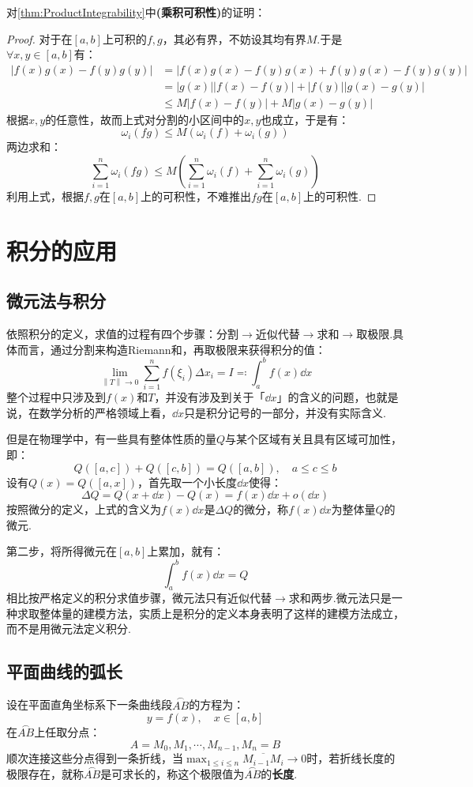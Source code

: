 对\cref{thm:ProductIntegrability}中\textbf{(乘积可积性)}的证明：
\begin{proof}
    对于在$[a,b]$上可积的$f,g$，其必有界，不妨设其均有界$M$.于是$\forall x,y\in[a,b]$有：
    \begin{align*}
        |f(x)g(x)-f(y)g(y)| &= |f(x)g(x)-f(y)g(x)+f(y)g(x)-f(y)g(y)|\\
        &= |g(x)||f(x)-f(y)| + |f(y)||g(x)-g(y)|\\
        &\leqslant M|f(x)-f(y)| + M|g(x)-g(y)|
    \end{align*}
    根据$x,y$的任意性，故而上式对分割的小区间中的$x,y$也成立，于是有：
    \[\omega_i(fg) \leqslant M(\omega_i(f)+\omega_i(g))\]
    两边求和：
    \[\sum_{i=1}^{n}\omega_i(fg) \leqslant M\left(\sum_{i=1}^{n}\omega_i(f)+\sum_{i=1}^{n}\omega_i(g)\right)\]
    利用上式，根据$f,g$在$[a,b]$上的可积性，不难推出$fg$在$[a,b]$上的可积性.
\end{proof}


\section{积分的应用}
\subsection{微元法与积分}
依照积分的定义，求值的过程有四个步骤：分割$\rightarrow$近似代替$\rightarrow$求和$\rightarrow$取极限.具体而言，通过分割来构造Riemann和，再取极限来获得积分的值：
\[\lim_{\left\|T\right\|\to 0}\sum_{i=1}^{n}f(\xi_i)\Delta x_i = I \eqcolon \int_{a}^{b}f(x)\dd{x}\]
整个过程中只涉及到$f(x)$和$T$，并没有涉及到关于「$\dd{x}$」的含义的问题，也就是说，在数学分析的严格领域上看，$\dd{x}$只是积分记号的一部分，并没有实际含义.

但是在物理学中，有一些具有整体性质的量$Q$与某个区域有关且具有区域可加性，即：
\[Q([a,c])+Q([c,b])=Q([a,b]),\quad a \leqslant c \leqslant b\]
设有$Q(x) = Q([a,x])$，首先取一个小长度$\dd{x}$使得：
\[\Delta Q = Q(x+\dd{x}) - Q(x) = f(x)\dd{x} + o(\dd{x})\]
按照微分的定义，上式的含义为$f(x)\dd{x}$是$\Delta Q$的微分，称$f(x)\dd{x}$为整体量$Q$的微元.

第二步，将所得微元在$[a,b]$上累加，就有：
\[\int_{a}^{b}f(x)\dd{x} = Q\]
相比按严格定义的积分求值步骤，微元法只有近似代替$\rightarrow$求和两步.微元法只是一种求取整体量的建模方法，实质上是积分的定义本身表明了这样的建模方法成立，而不是用微元法定义积分.


\subsection{平面曲线的弧长}
\begin{definition}
    设在平面直角坐标系下一条曲线段$\overset{\frown}{AB}$的方程为：
    \[y = f(x), \quad x \in [a,b]\]
    在$\overset{\frown}{AB}$上任取分点：
    \[A = M_0,M_1,\cdots,M_{n-1},M_n=B\]
    顺次连接这些分点得到一条折线，当$\displaystyle\max_{1 \leqslant i \leqslant n}\overline{M_{i-1}M_i} \to 0$时，若折线长度的极限存在，就称$\overset{\frown}{AB}$是可求长的，称这个极限值为$\overset{\frown}{AB}$的\textbf{长度}.
\end{definition}


